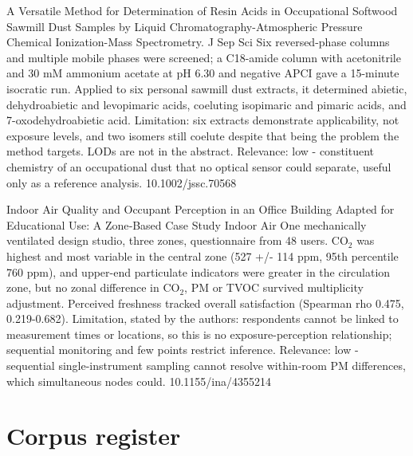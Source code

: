 \documentclass[10pt]{article}
\begin{document}
{A Versatile Method for Determination of Resin Acids in Occupational Softwood Sawmill Dust Samples by Liquid Chromatography-Atmospheric Pressure Chemical Ionization-Mass Spectrometry.}
{J Sep Sci}
{Six reversed-phase columns and multiple mobile phases were screened; a C18-amide column with acetonitrile and 30 mM ammonium acetate at pH 6.30 and negative APCI gave a 15-minute isocratic run. Applied to six personal sawmill dust extracts, it determined abietic, dehydroabietic and levopimaric acids, coeluting isopimaric and pimaric acids, and 7-oxodehydroabietic acid. Limitation: six extracts demonstrate applicability, not exposure levels, and two isomers still coelute despite that being the problem the method targets. LODs are not in the abstract. Relevance: low - constituent chemistry of an occupational dust that no optical sensor could separate, useful only as a reference analysis.}
{10.1002/jssc.70568}

{Indoor Air Quality and Occupant Perception in an Office Building Adapted for Educational Use: A Zone‐Based Case Study}
{Indoor Air}
{One mechanically ventilated design studio, three zones, questionnaire from 48 users. CO$_2$ was highest and most variable in the central zone (527 +/- 114 ppm, 95th percentile 760 ppm), and upper-end particulate indicators were greater in the circulation zone, but no zonal difference in CO$_2$, PM or TVOC survived multiplicity adjustment. Perceived freshness tracked overall satisfaction (Spearman rho 0.475, 0.219-0.682). Limitation, stated by the authors: respondents cannot be linked to measurement times or locations, so this is no exposure-perception relationship; sequential monitoring and few points restrict inference. Relevance: low - sequential single-instrument sampling cannot resolve within-room PM differences, which simultaneous nodes could.}
{10.1155/ina/4355214}

\clearpage
\section*{\sffamily\bfseries\color{Deep}Corpus register}
\vspace{-1.5mm}{\color{Amber}\rule{\linewidth}{1.1pt}}\vspace{2.5mm}



\vspace{2mm}
\end{document}
